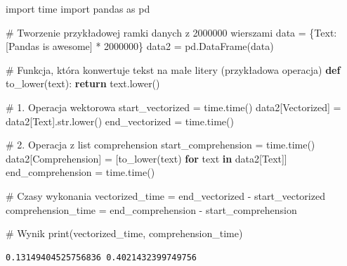 \documentclass[
  polish,
  letterpaper,
  DIV=11,
  numbers=noendperiod]{scrreprt}
\newenvironment{Shaded}{\begin{snugshade}}{\end{snugshade}}
\newcommand{\BuiltInTok}[1]{\textcolor[rgb]{0.00,0.23,0.31}{#1}}
\newcommand{\CommentTok}[1]{\textcolor[rgb]{0.37,0.37,0.37}{#1}}
\newcommand{\ControlFlowTok}[1]{\textcolor[rgb]{0.00,0.23,0.31}{\textbf{#1}}}
\newcommand{\DecValTok}[1]{\textcolor[rgb]{0.68,0.00,0.00}{#1}}
\newcommand{\ImportTok}[1]{\textcolor[rgb]{0.00,0.46,0.62}{#1}}
\newcommand{\KeywordTok}[1]{\textcolor[rgb]{0.00,0.23,0.31}{\textbf{#1}}}
\newcommand{\NormalTok}[1]{\textcolor[rgb]{0.00,0.23,0.31}{#1}}
\newcommand{\OperatorTok}[1]{\textcolor[rgb]{0.37,0.37,0.37}{#1}}
\newcommand{\StringTok}[1]{\textcolor[rgb]{0.13,0.47,0.30}{#1}}
\begin{document}
\begin{Shaded}
\begin{Highlighting}[]
\ImportTok{import}\NormalTok{ time}
\ImportTok{import}\NormalTok{ pandas }\ImportTok{as}\NormalTok{ pd}

\CommentTok{\# Tworzenie przykładowej ramki danych z 2000000 wierszami}
\NormalTok{data }\OperatorTok{=}\NormalTok{ \{}\StringTok{\textquotesingle{}Text\textquotesingle{}}\NormalTok{: [}\StringTok{\textquotesingle{}Pandas is awesome\textquotesingle{}}\NormalTok{] }\OperatorTok{*} \DecValTok{2000000}\NormalTok{\}}
\NormalTok{data2 }\OperatorTok{=}\NormalTok{ pd.DataFrame(data)}


\CommentTok{\# Funkcja, która konwertuje tekst na małe litery (przykładowa operacja)}
\KeywordTok{def}\NormalTok{ to\_lower(text):}
    \ControlFlowTok{return}\NormalTok{ text.lower()}


\CommentTok{\# 1. Operacja wektorowa}
\NormalTok{start\_vectorized }\OperatorTok{=}\NormalTok{ time.time()}
\NormalTok{data2[}\StringTok{\textquotesingle{}Vectorized\textquotesingle{}}\NormalTok{] }\OperatorTok{=}\NormalTok{ data2[}\StringTok{\textquotesingle{}Text\textquotesingle{}}\NormalTok{].}\BuiltInTok{str}\NormalTok{.lower()}
\NormalTok{end\_vectorized }\OperatorTok{=}\NormalTok{ time.time()}

\CommentTok{\# 2. Operacja z list comprehension}
\NormalTok{start\_comprehension }\OperatorTok{=}\NormalTok{ time.time()}
\NormalTok{data2[}\StringTok{\textquotesingle{}Comprehension\textquotesingle{}}\NormalTok{] }\OperatorTok{=}\NormalTok{ [to\_lower(text) }\ControlFlowTok{for}\NormalTok{ text }\KeywordTok{in}\NormalTok{ data2[}\StringTok{\textquotesingle{}Text\textquotesingle{}}\NormalTok{]]}
\NormalTok{end\_comprehension }\OperatorTok{=}\NormalTok{ time.time()}

\CommentTok{\# Czasy wykonania}
\NormalTok{vectorized\_time }\OperatorTok{=}\NormalTok{ end\_vectorized }\OperatorTok{{-}}\NormalTok{ start\_vectorized}
\NormalTok{comprehension\_time }\OperatorTok{=}\NormalTok{ end\_comprehension }\OperatorTok{{-}}\NormalTok{ start\_comprehension}

\CommentTok{\# Wynik}
\BuiltInTok{print}\NormalTok{(vectorized\_time, comprehension\_time)}
\end{Highlighting}
\end{Shaded}

\begin{verbatim}
0.13149404525756836 0.4021432399749756
\end{verbatim}
\end{document}
